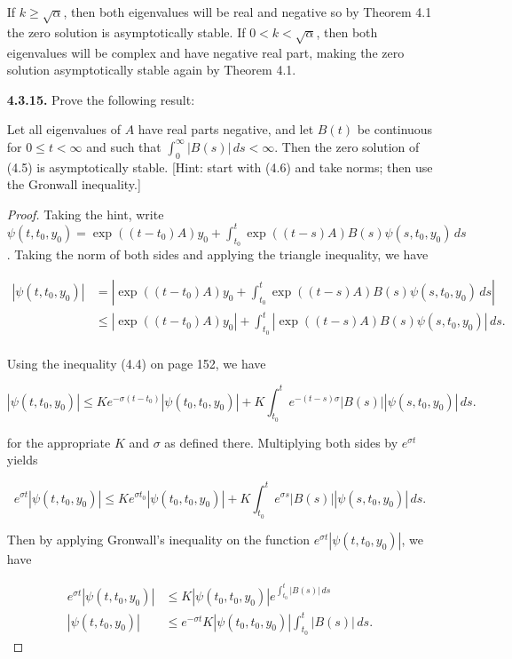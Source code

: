 \documentclass[11pt,oneside,english]{amsart}
\theoremstyle{definition}
\begin{document}
\begin{enumerate}
If $k\geq \sqrt{\alpha}$, then both eigenvalues will be real and negative so by Theorem 4.1 the zero solution is asymptotically stable. If $0<k<\sqrt{\alpha}$, then both eigenvalues will be complex and have negative real part, making the zero solution asymptotically stable again by Theorem 4.1.



\vfill
\pagebreak



\item[\textbf{4.3.15.}] Prove the following result:

Let all eigenvalues of $A$ have real parts negative, and let $B(t)$ be continuous for $0\leq t<\infty$ and such that $\int_0^\infty |B(s)|\,ds<\infty$. Then the zero solution of (4.5) is asymptotically stable. [Hint: start with (4.6) and take norms; then use the Gronwall inequality.]

\begin{proof}

Taking the hint, write $\psi(t,t_0,y_0)=\exp((t-t_0)A)y_0+\int_{t_0}^t\exp((t-s)A)B(s)\psi(s,t_0,y_0)\,ds$. Taking the norm of both sides and applying the triangle inequality, we have

\begin{align*}
\left|\psi(t,t_0,y_0)\right|&=\left|\exp((t-t_0)A)y_0+\int_{t_0}^t\exp((t-s)A)B(s)\psi(s,t_0,y_0)\,ds\right|\\[2mm]
&\leq \left|\exp((t-t_0)A)y_0\right|+\int_{t_0}^t\left|\exp((t-s)A)B(s)\psi(s,t_0,y_0)\right|\,ds.\\[2mm]
\end{align*}

\vspace{-10mm}
Using the inequality (4.4) on page 152, we have 

\[
|\psi(t,t_0,y_0)|\leq Ke^{-\sigma(t-t_0)}|\psi(t_0,t_0,y_0)|+K\int_{t_0}^te^{-(t-s)\sigma}|B(s)||\psi(s,t_0,y_0)|\,ds.
\]

for the appropriate $K$ and $\sigma$ as defined there. Multiplying both sides by $e^{\sigma t}$ yields

\[
e^{\sigma t}|\psi(t,t_0,y_0)|\leq Ke^{\sigma t_0}|\psi(t_0,t_0,y_0)|+K\int_{t_0}^te^{\sigma s}|B(s)||\psi(s,t_0,y_0)|\,ds.
\]

\vspace{-5mm}
Then by applying Gronwall's inequality on the function $e^{\sigma t}|\psi(t,t_0,y_0)|$, we have

\vspace{-5mm}
\begin{align*}
e^{\sigma t}|\psi(t,t_0,y_0)|&\leq K|\psi(t_0,t_0,y_0)|e^{\int_{t_0}^t|B(s)|\,ds}\\[2mm]
|\psi(t,t_0,y_0)|&\leq e^{-\sigma t}K|\psi(t_0,t_0,y_0)|\int_{t_0}^t|B(s)|\,ds.
\end{align*}


\end{proof}
\end{enumerate}
\end{document}
